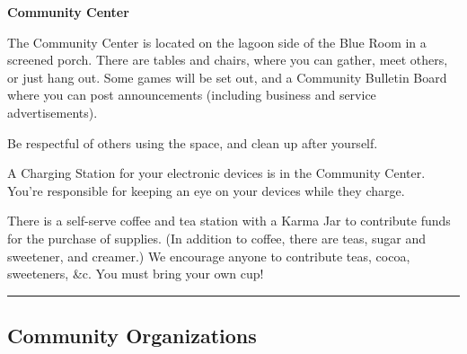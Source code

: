 \documentclass[9pt,twoside,openright,final,article]{memoir}
\def\fpg{{\beltanefamily FPG\ }}
\renewcommand{\pfbreakdisplay}{%
  \needspace{24pt}%
  \vspace{8pt}\\\ding{76}\quad\ding{77}\quad\ding{78}\\%
  \vspace{11pt}}
\let\oldsection=\section
\renewcommand{\section}[1]{%
  \vspace{3pt}%
  \needspace{1in}%
  { \hrule } \nopagebreak %
  \begin{center}\oldsection{#1}\end{center}\nopagebreak{}}
\renewcommand{\subsection}[1]{%
  \vspace{6pt}%
  \needspace{1.25in}%
  \begin{center}\textbf{\Large \beltanefamily #1}\end{center}

  \nopagebreak}
\begin{document}
\begin{multicols}{2}

  \subsection{\fpg Community Center}

  The Community Center is located on the lagoon side of the Blue Room
  in a screened porch.  There are tables and chairs, where you can
  gather, meet others, or just hang out. Some games will be set out,
  and a Community Bulletin Board where you can post announcements
  (including business and service advertisements).

  Be respectful of others using the space, and clean up after
  yourself.

  A Charging Station for your electronic devices is in the Community
  Center. {\small You're responsible for keeping an eye on your
    devices while they charge.}

  There is a self-serve coffee and tea station with a Karma Jar to
  contribute funds for the purchase of supplies. (In addition to
  coffee, there are teas, sugar and sweetener, and creamer.)  We
  encourage anyone to contribute teas, cocoa, sweeteners, \&c. You
  must bring your own cup!


  \section{Community Organizations}







\end{multicols}
\end{document}

